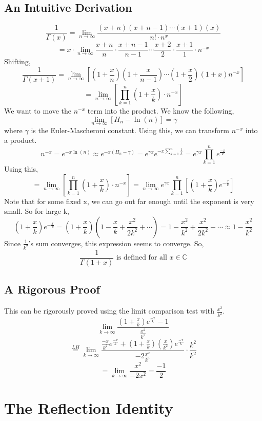 \documentclass[../main.tex]{subfiles}
\begin{document}
    \subsection{An Intuitive Derivation}
        $$\frac{1}{\Gamma(x)}=\lim_{n\rightarrow\infty}\frac{(x+n)(x+n-1)\cdots(x+1)(x)}{n!\cdot n^{x}}$$
        $$=x\cdot \lim_{n\rightarrow\infty}\frac{x+n}{n}\cdot\frac{x+n-1}{n-1}\cdots\frac{x+2}{2}\cdot\frac{x+1}{1}\cdot n^{-x}$$
        Shifting,
        $$\frac{1}{\Gamma(x+1)}=\lim_{n\rightarrow\infty}\left[(1+\frac{x}{n})(1+\frac{x}{n-1})\cdots (1+\frac{x}{2})(1+x)n^{-x}\right]$$
        $$=\lim_{n\rightarrow\infty}\left[\prod_{k=1}^{n}(1+\frac{x}{k})\cdot n^{-x}\right]$$
        We want to move the $n^{-x}$ term into the product. We know the following,
        $$\lim_{n\rightarrow\infty}\left[H_{n}-\ln(n)\right]=\gamma$$
        where $\gamma$ is the Euler-Mascheroni constant.
        Using this, we can transform $n^{-x}$ into a product.
        $$n^{-x}=e^{-x\ln(n)}\approx e^{-x(H_{n}-\gamma)}=e^{\gamma x}e^{-x\sum_{k=1}^{n}\frac{1}{k}}=e^{\gamma x}\prod_{k=1}^{n}e^{\frac{-x}{k}}$$
        Using this,
        $$=\lim_{n\rightarrow\infty}\left[\prod_{k=1}^{n}(1+\frac{x}{k})\cdot n^{-x}\right]=\lim_{n\rightarrow\infty}e^{\gamma x}\prod_{k=1}^{n}\left[(1+\frac{x}{k})e^{-\frac{x}{k}}\right]$$
        Note that for some fixed x, we can go out far enough until the exponent is very small. So for large k,
        $$(1+\frac{x}{k})e^{-\frac{x}{k}}=(1+\frac{x}{k})(1-\frac{x}{k}+\frac{x^{2}}{2k^{2}}+\cdots)=1-\frac{x^{2}}{k^{2}}+\frac{x^{2}}{2k^{2}}-\cdots\approx 1-\frac{x^{2}}{k^{2}}$$
        Since $\frac{1}{k^{2}}$'s sum converges, this expression seems to converge. So,
        $$\frac{1}{\Gamma(1+x)}\text{ is defined for all } x\in\mathbb{C}$$

    \subsection{A Rigorous Proof}
        This can be rigorously proved using the limit comparison test with $\frac{x^{2}}{k^{2}}$.
        $$\lim_{k\rightarrow\infty}\frac{(1+\frac{x}{k})e^{\frac{-x}{k}}-1}{\frac{x^{2}}{k^{2}}}$$
        $$\stackrel{LH}{=}\lim_{k\rightarrow\infty}\frac{\frac{-x}{k^{2}}e^{\frac{-x}{k}}+(1+\frac{x}{k})(\frac{x}{k^{2}})e^{\frac{-x}{k}}}{-2\frac{x^{2}}{k^{3}}}\cdot\frac{k^{2}}{k^{2}}$$
        $$=\lim_{k\rightarrow\infty}\frac{x^{2}}{-2x^{2}}=\frac{-1}{2}$$

\section{The Reflection Identity}
\end{document}
